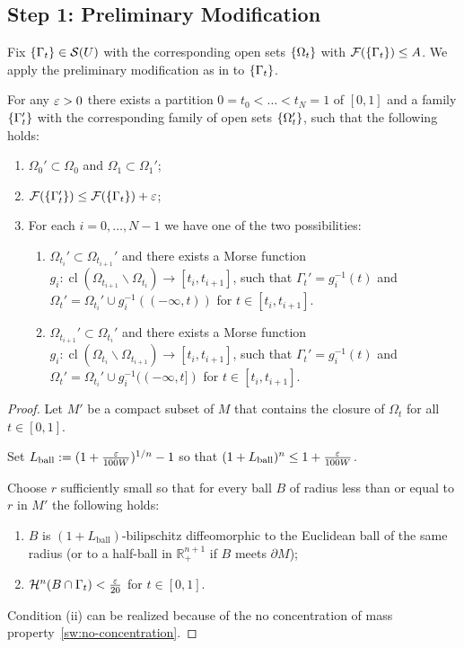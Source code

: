 \subsection{Step 1: Preliminary Modification}
Fix $\left\{\Gamma_t\right\} \in \mathcal{S}(U)$ with the corresponding open sets $\left\{\Omega_t\right\}$ with $\mathcal{F}(\left\{\Gamma_t\right\}) \leq A$. We apply the preliminary modification as in \cite[Lemma 6.2]{CL20} to $\left\{\Gamma_t\right\}$.
\begin{lemma}\label{lem:preliminary-modification}
    For any $\varepsilon > 0$ there exists a partition $0 = t_0 < \dots < t_N = 1$ of $[0, 1]$ and a family $\left\{\Gamma_t'\right\}$ with the corresponding family of open sets $\left\{\Omega_t'\right\}$, such that the following holds:
    \begin{enumerate}
        \item[(1.1)] $\Omega_0' \subset \Omega_0$ and $\Omega_1 \subset \Omega_1'$;

        \item[(1.2)] $\mathcal{F}(\left\{\Gamma_t'\right\}) \leq \mathcal{F}(\left\{\Gamma_t\right\}) + \varepsilon$;
        \item[(1.3)] For each $i = 0, \dots, N - 1$ we have one of the two possibilities:
        \begin{enumerate}
            \item[(A)] $\Omega_{t_i}' \subset \Omega_{t_{i + 1}}'$ and there exists a Morse function $g_i: \operatorname{cl}(\Omega_{t_{i + 1}}\backslash \Omega_{t_i}) \to [t_i, t_{i + 1}]$, such that $\Gamma_t' = g_i^{-1}(t)$ and $\Omega_t' = \Omega_{t_i}'\cup g_i^{-1}((-\infty, t))$ for $t \in [t_i, t_{i + 1}]$.
            \item[(B)] $\Omega_{t_{i + 1}}' \subset
             \Omega_{t_i}'$ and there exists a Morse function $g_i: \operatorname{cl}(\Omega_{t_i}\backslash\Omega_{t_{i + 1}}) \to [t_i, t_{i + 1}]$, such that $\Gamma_t' = g_i^{-1}(t)$ and $\Omega_t' = \Omega_{t_i}'\cup g_i^{-1}((-\infty, t])$ for $t \in [t_i, t_{i + 1}]$.
        \end{enumerate}
    \end{enumerate}
    \begin{proof}
        Let $M'$ be a compact subset of $M$ that contains the closure of $\Omega_t$ for all $t \in [0, 1]$.

        Set $L_{\mathrm{ball}}:=(1+\frac{\varepsilon}{100W})^{1/n}-1$ so that $(1+L_{\mathrm{ball}})^n\le 1+\frac{\varepsilon}{100W}$.

        Choose $r$ sufficiently small so that for every ball $B$ of radius less than or equal to $r$ in $M'$ the following holds:
        \begin{enumerate}
            \item[(i)] $B$ is $(1 + L_{\mathrm{ball}})$-bilipschitz diffeomorphic to the Euclidean ball of the same radius (or to a half-ball in $\mathbb{R}^{n+1}_+$ if $B$ meets $\partial M$);
            \item[(ii)] $\mathcal{H}^n(B\cap \Gamma_t) < \frac{\varepsilon}{20}$ for $t \in [0, 1]$.
        \end{enumerate}
        Condition (ii) can be realized because of the no concentration of mass property~\ref{sw:no-concentration}.


\end{proof}
\end{lemma}
